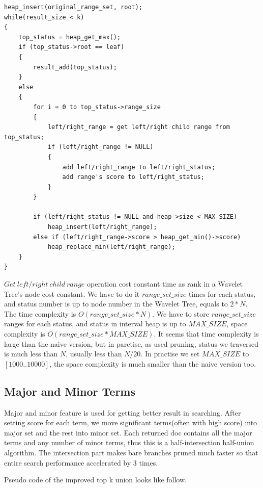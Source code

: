 \begin{scriptsize} \begin{verbatim}
heap_insert(original_range_set, root);
while(result_size < k)
{
    top_status = heap_get_max();
    if (top_status->root == leaf)
    {
        result_add(top_status);
    }
    else
    {
        for i = 0 to top_status->range_size
        {
            left/right_range = get left/right child range from top_status;
            if (left/right_range != NULL)
            {
                add left/right_range to left/right_status;
                add range's score to left/right_status;
            }
        }

        if (left/right_status != NULL and heap->size < MAX_SIZE)
            heap_insert(left/right_range);
        else if (left/right_range->score > heap_get_min()->score)
            heap_replace_min(left/right_range);
    }
}
\end{verbatim} \end{scriptsize}

\(Get\ left/right\ child\ range\) operation cost constant time as rank in a Wavelet Tree's node cost constant. We have to do it \(range\_set\_size\) times for each status, and status number is up to node number in the Wavelet Tree, equals to \(2*N\). The time complexity is \(O(range\_set\_size * N)\).
We have to store \(range\_set\_size\) ranges for each status, and status in interval heap is up to \(MAX\_SIZE\), space complexity is \(O(range\_set\_size * MAX\_SIZE)\).
It seems that time complexity is large than the naive version, but in parctise, as used pruning, status we traversed is much less than \(N\), usually less than \(N/20\). In practise we set \(MAX\_SIZE\) to \([1000..10000]\), the space complexity is much smaller than the naive version too.

\subsection{Major and Minor Terms}

Major and minor feature is used for getting better result in searching. After setting score for each term, we move significant terms(often with high score) into major set and the rest into minor set. Each returned doc contains all the major terms and any number of minor terms, thus this is a half-intersection half-union algorithm. The intersection part makes bare branches pruned much faster so that entire search performance accelerated by 3 times.

Pseudo code of the improved top k union looks like follow.

